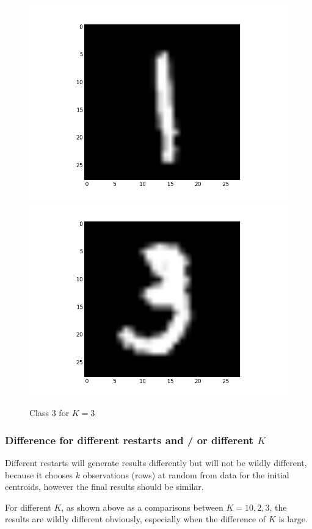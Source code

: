 \documentclass[submit]{harvardml}
\begin{document}
\begin{figure}[ht]
    \includegraphics[scale=0.15]{K3-representative-2-2}
    \includegraphics[scale=0.15]{K3-representative-2-3}
    \caption{Class 3 for $K=3$}
\end{figure}

\subsubsection*{Difference for different restarts and / or different $K$}
Different restarts will generate results differently but will not be wildly different, because it chooses $k$ observations (rows) at random from data for the initial centroids, however the final results should be similar.

For different $K$, as shown above as a comparisons between $K=10,2,3$, the results are wildly different obviously, especially when the difference of $K$ is large.
\end{document}
